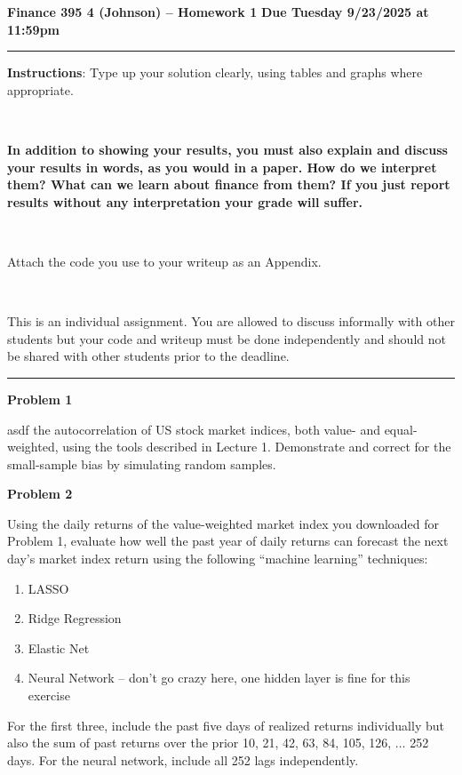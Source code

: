 \documentclass[12pt]{article}
\begin{document}
\thispagestyle{empty}
\begin{center}
{\Large \textbf{Finance 395 4 (Johnson) -- Homework 1}}
\vskip 12pt
{\normalsize \textbf{Due Tuesday 9/23/2025 at 11:59pm}}
\end{center}
\hrule 
\vskip 12pt
\textbf{Instructions}: Type up your solution clearly, using tables and graphs where appropriate.

~

\noindent \textbf{In addition to showing your results, you must also explain and discuss your results in words, as you would in a paper. How do we interpret them? What can we learn about finance from them? If you just report results without any interpretation your grade will suffer.}

~

\noindent Attach the code you use to your writeup as an Appendix.

~

\noindent This is an individual assignment. You are allowed to discuss informally with other students but your code and writeup must be done independently and should not be shared with other students prior to the deadline.
\vskip 12pt
\hrule 
\vskip 12pt

\noindent \textbf{Problem 1}

asdf the autocorrelation of US stock market indices, both value- and equal-weighted, using the tools described in Lecture 1. Demonstrate and correct for the small-sample bias by simulating random samples.

\vskip 12pt

\noindent \textbf{Problem 2}

Using the daily returns of the value-weighted market index you downloaded for Problem 1, evaluate how well the past year of daily returns can forecast the next day's market index return using the following ``machine learning'' techniques:
\begin{enumerate}
    \item LASSO
    \item Ridge Regression
    \item Elastic Net
    \item Neural Network -- don't go crazy here, one hidden layer is fine for this exercise
\end{enumerate}
For the first three, include the past five days of realized returns individually but also the sum of past returns over the prior 10, 21, 42, 63, 84, 105, 126, $\ldots$ 252 days. For the neural network, include all 252 lags independently.
\end{document}
